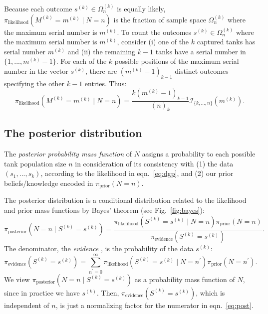 \documentclass[11pt, oneside]{article}
\newcommand{\data}{$(s_1, ..., s_k)$\xspace}
\begin{document}
Because each outcome $s^{(k)}\in \Omega_n^{(k)}$ is equally likely, $\pi_{\text{likelihood}}(M^{(k)}=m^{(k)} \mid N=n)$ is the fraction of sample space $\Omega_n^{(k)}$ where the maximum serial number is $m^{(k)}$.
To count the outcomes $s^{(k)}\in\Omega_n^{(k)}$ where the maximum serial number is $m^{(k)}$, consider (i) one of the $k$ captured tanks has serial number $m^{(k)}$ and (ii) the remaining $k-1$ tanks have a serial number in $\{1, ..., m^{(k)}-1\}$.
For each of the $k$ possible positions of the maximum serial number in the vector $s^{(k)}$, there are $(m^{(k)}-1)_{k-1}$ distinct outcomes specifying the other $k-1$ entries.
Thus:
\begin{equation}
	\pi_{\text{likelihood}}(M^{(k)}=m^{(k)} \mid N=n)=
	\dfrac{k(m^{(k)}-1)_{k-1}}{(n)_k} \mathcal{I}_{\{k,...,n\}}(m^{(k)}). \label{eq:likelihood_m}
 \end{equation}
 

\subsection{The posterior distribution}
\label{sec:posterior}
The \emph{posterior probability mass function} of $N$ assigns a probability to each possible tank population size $n$ in consideration of its consistency with (1) the data \data, according to the likelihood in eqn.~\ref{eq:dgp}, and (2) our prior beliefs/knowledge encoded in $\pi_{\text{prior}}(N=n)$. 

The posterior distribution is a conditional distribution related to the likelihood and prior mass functions by Bayes' theorem \cite{kruschke2014doing} (see Fig.~\ref{fig:bayes}):
\begin{equation}
	\pi_{\text{posterior}}(N=n \mid S^{(k)}=s^{(k)}) = 
	\frac{\pi_{\text{likelihood}}(S^{(k)}=s^{(k)} \mid N=n) \pi_{\text{prior}}(N=n)}{\pi_{\text{evidence}}(S^{(k)}=s^{(k)})}. \label{eq:post}
\end{equation} 
The denominator, the \emph{evidence} \cite{kruschke2014doing}, is the probability of the data $s^{(k)}$:
\begin{equation}
	\pi_{\text{evidence}}(S^{(k)}=s^{(k)})= \displaystyle \sum_{n^\prime=0}^\infty \pi_{\text{likelihood}}(S^{(k)}=s^{(k)} \mid N=n^\prime) \pi_{\text{prior}}(N=n^\prime). \label{eq:prob_data}
\end{equation}
We view $\pi_{\text{posterior}}(N=n \mid S^{(k)}=s^{(k)})$ as a probability mass function of $N$, since in practice we have $s^{(k)}$. 
Then, $\pi_{\text{evidence}}(S^{(k)}=s^{(k)})$, which is independent of $n$, is just a normalizing factor for the numerator in eqn.~\ref{eq:post}. 
\end{document}
